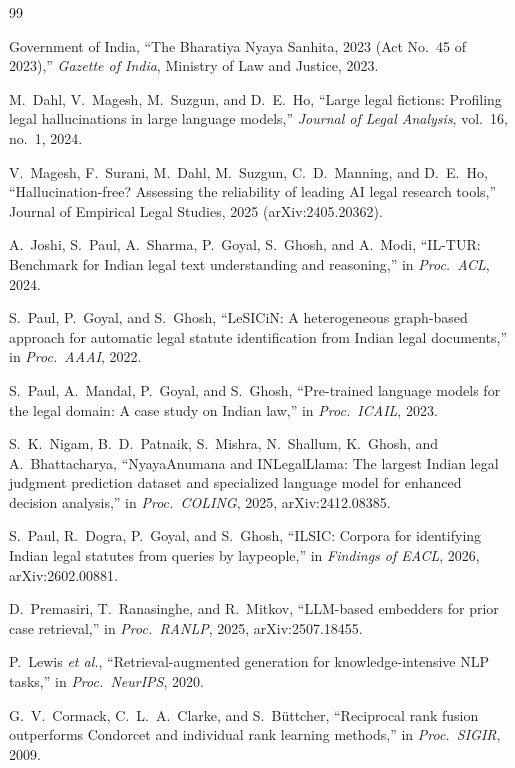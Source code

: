\documentclass[conference]{IEEEtran}
\begin{document}
\begin{thebibliography}{99}

 Government of India, ``The Bharatiya Nyaya Sanhita, 2023 (Act No.\ 45 of 2023),'' \emph{Gazette of India}, Ministry of Law and Justice, 2023.

 M.~Dahl, V.~Magesh, M.~Suzgun, and D.~E.~Ho, ``Large legal fictions: Profiling legal hallucinations in large language models,'' \emph{Journal of Legal Analysis}, vol.~16, no.~1, 2024.

 V.~Magesh, F.~Surani, M.~Dahl, M.~Suzgun, C.~D.~Manning, and D.~E.~Ho, ``Hallucination-free? Assessing the reliability of leading AI legal research tools,'' Journal of Empirical Legal Studies, 2025 (arXiv:2405.20362).

 A.~Joshi, S.~Paul, A.~Sharma, P.~Goyal, S.~Ghosh, and A.~Modi, ``IL-TUR: Benchmark for Indian legal text understanding and reasoning,'' in \emph{Proc.\ ACL}, 2024.

 S.~Paul, P.~Goyal, and S.~Ghosh, ``LeSICiN: A heterogeneous graph-based approach for automatic legal statute identification from Indian legal documents,'' in \emph{Proc.\ AAAI}, 2022.

 S.~Paul, A.~Mandal, P.~Goyal, and S.~Ghosh, ``Pre-trained language models for the legal domain: A case study on Indian law,'' in \emph{Proc.\ ICAIL}, 2023.

 S.~K.~Nigam, B.~D.~Patnaik, S.~Mishra, N.~Shallum, K.~Ghosh, and A.~Bhattacharya, ``NyayaAnumana and INLegalLlama: The largest Indian legal judgment prediction dataset and specialized language model for enhanced decision analysis,'' in \emph{Proc.\ COLING}, 2025, arXiv:2412.08385.

 S.~Paul, R.~Dogra, P.~Goyal, and S.~Ghosh, ``ILSIC: Corpora for identifying Indian legal statutes from queries by laypeople,'' in \emph{Findings of EACL}, 2026, arXiv:2602.00881.

 D.~Premasiri, T.~Ranasinghe, and R.~Mitkov, ``LLM-based embedders for prior case retrieval,'' in \emph{Proc.\ RANLP}, 2025, arXiv:2507.18455.

 P.~Lewis \emph{et al.}, ``Retrieval-augmented generation for knowledge-intensive NLP tasks,'' in \emph{Proc.\ NeurIPS}, 2020.

 G.~V.~Cormack, C.~L.~A.~Clarke, and S.~B{\"u}ttcher, ``Reciprocal rank fusion outperforms Condorcet and individual rank learning methods,'' in \emph{Proc.\ SIGIR}, 2009.


\end{thebibliography}
\end{document}
